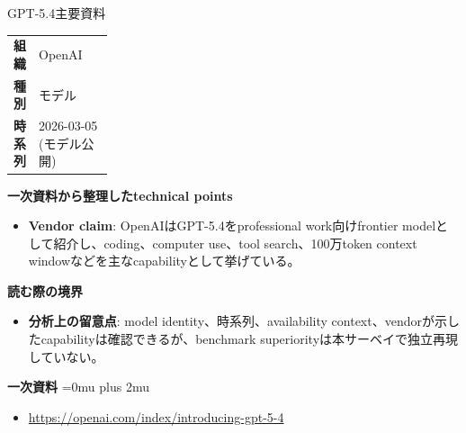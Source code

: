 \begin{technicalnote}{GPT-5.4}{主要資料}
\begingroup
\begin{tabularx}{\linewidth}{@{}>{\bfseries}p{0.22\linewidth}X@{}}
組織 & OpenAI \\
種別 & モデル \\
時系列 & 2026-03-05 (モデル公開) \\
\end{tabularx}
\smallskip
{\bfseries 一次資料から整理したtechnical points}
\begin{itemize}[leftmargin=1.5em,itemsep=0.35em]
\item \textbf{Vendor claim}: OpenAIはGPT-5.4をprofessional work向けfrontier modelとして紹介し、coding、computer use、tool search、100万token context windowなどを主なcapabilityとして挙げている。
\end{itemize}
\begin{minipage}{\linewidth}
{\bfseries 読む際の境界}
\begin{itemize}[leftmargin=1.5em,itemsep=0.35em]
\item \textbf{分析上の留意点}: model identity、時系列、availability context、vendorが示したcapabilityは確認できるが、benchmark superiorityは本サーベイで独立再現していない。
\end{itemize}
\begin{samepage}
{\bfseries 一次資料}
\begingroup\sloppy
\Urlmuskip=0mu plus 2mu\relax
\begin{itemize}[leftmargin=1.5em,itemsep=0.25em]
\item {\scriptsize\url{https://openai.com/index/introducing-gpt-5-4}}
\end{itemize}
\endgroup
\end{samepage}
\end{minipage}
\endgroup
\end{technicalnote}
\medskip

